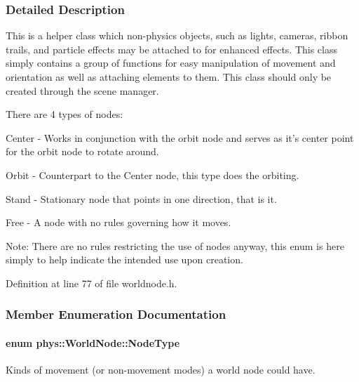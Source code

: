 \subsubsection{Detailed Description}
This is a helper class which non-\/physics objects, such as lights, cameras, ribbon trails, and particle effects may be attached to for enhanced effects. This class simply contains a group of functions for easy manipulation of movement and orientation as well as attaching elements to them. This class should only be created through the scene manager. \par
 There are 4 types of nodes: \par
 Center -\/ Works in conjunction with the orbit node and serves as it's center point for the orbit node to rotate around. \par
 Orbit -\/ Counterpart to the Center node, this type does the orbiting. \par
 Stand -\/ Stationary node that points in one direction, that is it. \par
 Free -\/ A node with no rules governing how it moves. \par
 Note: There are no rules restricting the use of nodes anyway, this enum is here simply to help indicate the intended use upon creation. 

Definition at line 77 of file worldnode.h.



\subsubsection{Member Enumeration Documentation}
\hypertarget{classphys_1_1WorldNode_a0b178b06aa411b00c4c2ccd926d9bf5a}{
\paragraph[{NodeType}]{\setlength{\rightskip}{0pt plus 5cm}enum {\bf phys::WorldNode::NodeType}}\hfill}
\label{d2/d3e/classphys_1_1WorldNode_a0b178b06aa411b00c4c2ccd926d9bf5a}


Kinds of movement (or non-\/movement modes) a world node could have. 

